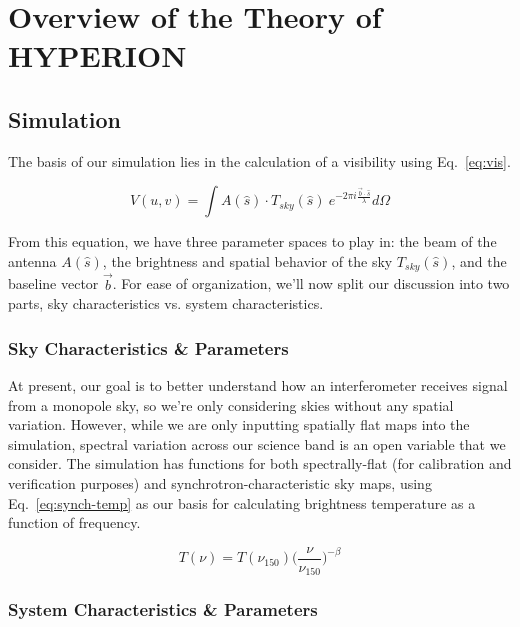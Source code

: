 \chapter{Overview of the Theory of HYPERION}

\section{Simulation}

The basis of our simulation lies in the calculation of a visibility using 
Eq.~\eqref{eq:vis}.

\begin{equation}
    \label{eq:vis}
    V(u,v) = \int A(\hat{s}) \cdot T_{sky}(\hat{s}) ~e^{-2 \pi i \frac{\vec{b} 
    \cdot \hat{s}}{\lambda}} d\Omega
\end{equation}

From this equation, we have three parameter spaces to play in: the beam of the 
antenna $A(\hat{s})$, the brightness and spatial behavior of the sky 
$T_{sky}(\hat{s})$, and the baseline vector $\vec{b}$. For ease of 
organization, we'll now split our discussion into two parts, sky 
characteristics vs. system characteristics.

\subsection{Sky Characteristics \& Parameters}

At present, our goal is to better understand how an interferometer receives 
signal from a monopole sky, so we're only considering skies without any
spatial variation. However, while we are only inputting spatially flat maps 
into the simulation, spectral variation across our science band is an open 
variable that we consider.  The simulation has functions for both 
spectrally-flat (for calibration and verification purposes) and 
synchrotron-characteristic sky maps, using Eq.~\eqref{eq:synch-temp} as our 
basis for calculating brightness temperature as a function of frequency.  

\begin{equation}
    \label{eq:synch-temp}
    T(\nu) = T(\nu_{150}) \Big(\frac{\nu}{\nu_{150}} \Big)^{-\beta}
\end{equation}

\subsection{System Characteristics \& Parameters}

